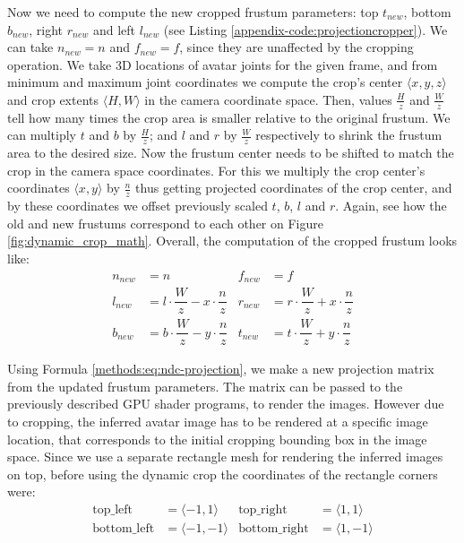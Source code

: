 Now we need to compute the new cropped frustum parameters: top $t_{new}$, bottom $b_{new}$, right $r_{new}$ and left $l_{new}$ (see Listing \ref{appendix-code:projectioncropper}). We can take $n_{new} = n$ and $f_{new} = f$, since they are unaffected by the cropping operation. We take 3D locations of avatar joints for the given frame, and from minimum and maximum joint coordinates we compute the crop's center $\langle x, y, z\rangle$ and crop extents $\langle H, W \rangle$ in the camera coordinate space. Then, values $\tfrac{H}{z}$ and $\tfrac{W}{z}$ tell how many times the crop area is smaller relative to the original frustum. We can multiply $t$ and $b$ by $\tfrac{H}{z}$; and $l$ and $r$ by $\tfrac{W}{z}$ respectively to shrink the frustum area to the desired size. Now the frustum center needs to be shifted to match the crop in the camera space coordinates. For this we multiply the crop center's coordinates $\langle x, y \rangle$  by $\tfrac{n}{z}$ thus getting projected coordinates of the crop center, and by these coordinates we offset previously scaled $t$, $b$, $l$ and $r$. Again, see how the old and new frustums correspond to each other on Figure \ref{fig:dynamic_crop_math}. Overall, the computation of the cropped frustum looks like:
\begin{align}
	n_{new} &= n & f_{new} &= f \\
	l_{new} &= l\cdot\dfrac{W}{z} - x\cdot \dfrac{n}{z} & r_{new} &= r\cdot\dfrac{W}{z} + x\cdot \dfrac{n}{z} \\
	b_{new} &= b\cdot\dfrac{W}{z} - y\cdot \dfrac{n}{z} & t_{new} &= t\cdot\dfrac{W}{z} + y\cdot \dfrac{n}{z} \label{methods:eq:frustum-new-parameters}
\end{align}

Using Formula \ref{methods:eq:ndc-projection}, we make a new projection matrix from the updated frustum parameters. The matrix can be passed to the previously described GPU shader programs, to render the images. However due to cropping, the inferred avatar image has to be rendered at a specific image location, that corresponds to the initial cropping bounding box in the image space. Since we use a separate rectangle mesh for rendering the inferred images on top, before using the dynamic crop the coordinates of the rectangle corners were:
	\begin{align}
		\text{top{\_}left} &= \langle -1, 1 \rangle & \text{top{\_}right} &= \langle 1, 1 \rangle \\
		\text{bottom{\_}left} &= \langle -1, -1 \rangle & \text{bottom{\_}right} &= \langle 1, -1 \rangle
	\end{align}

